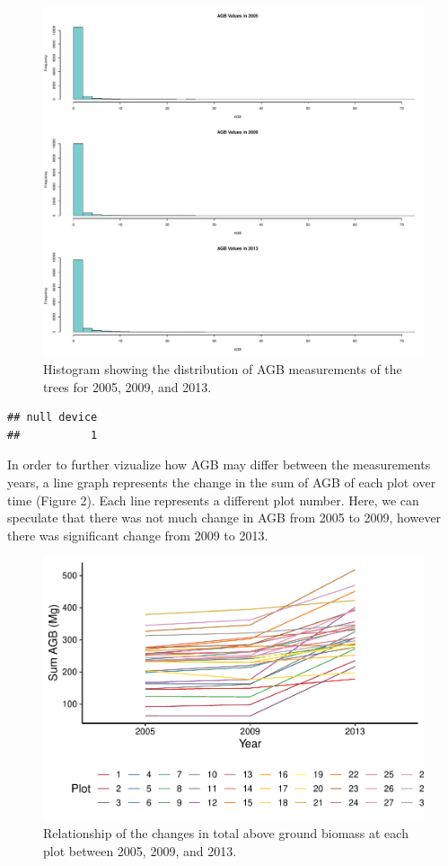\documentclass[12pt,]{article}
\begin{document}
\begin{figure}
\centering
\includegraphics{Project_Template_files/figure-latex/histograms-1.pdf}
\caption{Histogram showing the distribution of AGB measurements of the
trees for 2005, 2009, and 2013.}
\end{figure}

\begin{verbatim}
## null device 
##           1
\end{verbatim}

\newpage

In order to further vizualize how AGB may differ between the
measurements years, a line graph represents the change in the sum of AGB
of each plot over time (Figure 2). Each line represents a different plot
number. Here, we can speculate that there was not much change in AGB
from 2005 to 2009, however there was significant change from 2009 to
2013.

\begin{figure}
\centering
\includegraphics{Project_Template_files/figure-latex/data_visualization-1.pdf}
\caption{Relationship of the changes in total above ground biomass at
each plot between 2005, 2009, and 2013.}
\end{figure}
\end{document}
